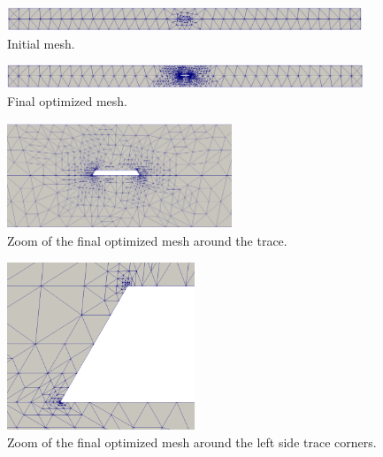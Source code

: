 \documentclass[titlepage]{article}
\renewcommand\_{\textunderscore\linebreak[1]}
\begin{document}
\begin{figure}[H]
  \centering
  \includegraphics[width=0.95\textwidth]{../regression/OpenParEM2D/Simonovich_stripline_study/screenshots/stripline_initial_mesh}
  \caption{Initial mesh.}
  \label{fig:stripline_initial_mesh}
\end{figure}
\begin{figure}[H]
  \centering
  \includegraphics[width=0.95\textwidth]{../regression/OpenParEM2D/Simonovich_stripline_study/screenshots/stripline_final_mesh}
  \caption{Final optimized mesh.}
  \label{fig:stripline_final_mesh}
\end{figure}
\begin{figure}[H]
  \centering
  \includegraphics[width=0.6\textwidth]{../regression/OpenParEM2D/Simonovich_stripline_study/screenshots/stripline_mesh_zoom1}
  \caption{Zoom of the final optimized mesh around the trace.}
  \label{fig:stripline_mesh_zoom1}
\end{figure}
\begin{figure}[H]
  \centering
  \includegraphics[width=0.5\textwidth]{../regression/OpenParEM2D/Simonovich_stripline_study/screenshots/stripline_mesh_zoom2}
  \caption{Zoom of the final optimized mesh around the left side trace corners.}
  \label{fig:stripline_mesh_zoom2}
\end{figure}
\end{document}

